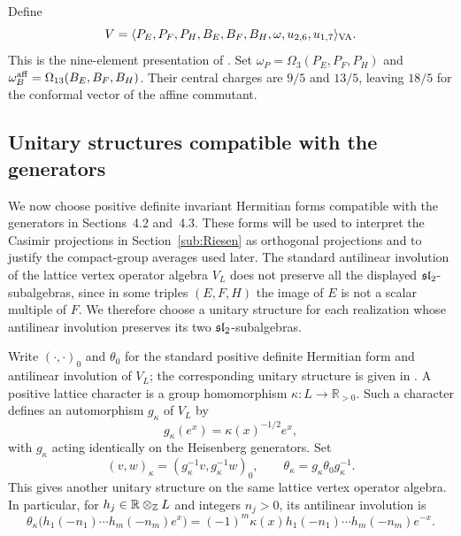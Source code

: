 \documentclass[11pt,reqno]{amsart}
\theoremstyle{definition}\newtheorem{definition}[theorem]{Definition}
\theoremstyle{remark}\newtheorem{remark}[theorem]{Remark}
\numberwithin{equation}{section}
\begin{document}
Define
\begin{equation}\label{eq:Jdef}
 V=\langle P_E,P_F,P_H,B_E,B_F,B_H,\omega,u_{2,6},u_{1,7}\rangle_{\rm VA}.
\end{equation}
This is the nine-element presentation of \cite[Section 3]{Jiao}. Set $\omega_P=\Omega_3(P_E,P_F,P_H)$ and $\omega_B^{\rm aff}=\Omega_{13}(B_E,B_F,B_H)$. Their central charges are $9/5$ and $13/5$, leaving $18/5$ for the conformal vector of the affine commutant.

\subsection{Unitary structures compatible with the generators}
We now choose positive definite invariant Hermitian forms compatible with the generators in Sections~4.2 and~4.3. These forms will be used to interpret the Casimir projections in Section~\ref{sub:Riesen} as orthogonal projections and to justify the compact-group averages used later. The standard antilinear involution of the lattice vertex operator algebra $V_L$ does not preserve all the displayed $\mathfrak{sl}_2$-subalgebras, since in some triples $(E,F,H)$ the image of $E$ is not a scalar multiple of $F$. We therefore choose a unitary structure for each realization whose antilinear involution preserves its two $\mathfrak{sl}_2$-subalgebras.

Write $(\cdot,\cdot)_0$ and $\theta_0$ for the standard positive definite Hermitian form and antilinear involution of $V_L$; the corresponding unitary structure is given in \cite[Theorem 4.12]{DLUnitary}. A positive lattice character is a group homomorphism $\kappa:L\longrightarrow\mathbb R_{>0}$. Such a character defines an automorphism $g_\kappa$ of $V_L$ by
\[
 g_\kappa(e^x)=\kappa(x)^{-1/2}e^x,
\]
with $g_\kappa$ acting identically on the Heisenberg generators. Set
\[
 (v,w)_\kappa=(g_\kappa^{-1}v,g_\kappa^{-1}w)_0,
 \qquad \theta_\kappa=g_\kappa\theta_0g_\kappa^{-1}.
\]
This gives another unitary structure on the same lattice vertex operator algebra. In particular, for $h_j\in\mathbb R\otimes_{\mathbb Z}L$ and integers $n_j>0$, its antilinear involution is
\[
 \theta_\kappa\bigl(h_1(-n_1)\cdots h_m(-n_m)e^x\bigr)
 =(-1)^m\kappa(x)h_1(-n_1)\cdots h_m(-n_m)e^{-x}.
\]
\end{document}
